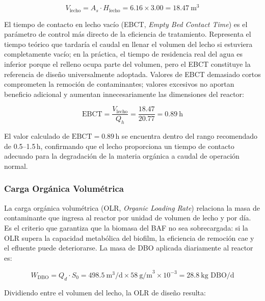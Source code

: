 \documentclass[12pt,a4paper]{article}
\begin{document}
\begin{equation}
V_{\text{lecho}} = A_{s} \cdot H_{\text{lecho}} = 6.16 \times 3.00 = 18.47\ \text{m}^3
\end{equation}

El tiempo de contacto en lecho vacío (EBCT, \textit{Empty Bed Contact Time}) es el parámetro de control más directo de la eficiencia de tratamiento. Representa el tiempo teórico que tardaría el caudal en llenar el volumen del lecho si estuviera completamente vacío; en la práctica, el tiempo de residencia real del agua es inferior porque el relleno ocupa parte del volumen, pero el EBCT constituye la referencia de diseño universalmente adoptada. Valores de EBCT demasiado cortos comprometen la remoción de contaminantes; valores excesivos no aportan beneficio adicional y aumentan innecesariamente las dimensiones del reactor:

\begin{equation}
\text{EBCT} = \frac{V_{\text{lecho}}}{Q_{h}} = \frac{18.47}{20.77} = 0.89\ \text{h}
\end{equation}

El valor calculado de $\text{EBCT} = 0.89$\,h se encuentra dentro del rango recomendado de 0.5--1.5\,h, confirmando que el lecho proporciona un tiempo de contacto adecuado para la degradación de la materia orgánica a caudal de operación normal.

\subsubsection*{Carga Orgánica Volumétrica}

La carga orgánica volumétrica (OLR, \textit{Organic Loading Rate}) relaciona la masa de contaminante que ingresa al reactor por unidad de volumen de lecho y por día. Es el criterio que garantiza que la biomasa del BAF no sea sobrecargada: si la OLR supera la capacidad metabólica del biofilm, la eficiencia de remoción cae y el efluente puede deteriorarse. La masa de DBO aplicada diariamente al reactor es:

\begin{equation}
W_{\text{DBO}} = Q_{d} \cdot S_0 = 498.5\ \text{m}^3\text{/d} \times 58\ \text{g/m}^3 \times 10^{-3} = 28.8\ \text{kg DBO/d}
\end{equation}

Dividiendo entre el volumen del lecho, la OLR de diseño resulta:
\end{document}
